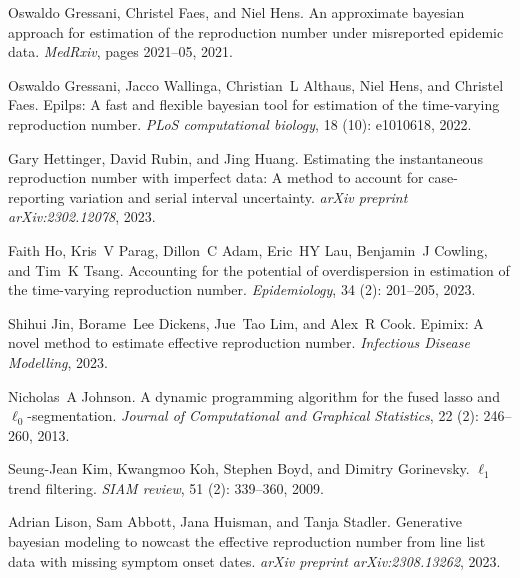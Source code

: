 \documentclass[10pt,letterpaper]{article}
\begin{document}
\begin{thebibliography}{23}
  Oswaldo Gressani, Christel Faes, and Niel Hens.
  \newblock An approximate bayesian approach for estimation of the reproduction
    number under misreported epidemic data.
  \newblock \emph{MedRxiv}, pages 2021--05, 2021.
  
  Oswaldo Gressani, Jacco Wallinga, Christian~L Althaus, Niel Hens, and Christel
    Faes.
  \newblock Epilps: A fast and flexible bayesian tool for estimation of the
    time-varying reproduction number.
  \newblock \emph{PLoS computational biology}, 18 (10):
    e1010618, 2022.
  
  Gary Hettinger, David Rubin, and Jing Huang.
  \newblock Estimating the instantaneous reproduction number with imperfect data:
    A method to account for case-reporting variation and serial interval
    uncertainty.
  \newblock \emph{arXiv preprint arXiv:2302.12078}, 2023.
  
  Faith Ho, Kris~V Parag, Dillon~C Adam, Eric~HY Lau, Benjamin~J Cowling, and
    Tim~K Tsang.
  \newblock Accounting for the potential of overdispersion in estimation of the
    time-varying reproduction number.
  \newblock \emph{Epidemiology}, 34 (2): 201--205, 2023.
  
  Shihui Jin, Borame~Lee Dickens, Jue~Tao Lim, and Alex~R Cook.
  \newblock Epimix: A novel method to estimate effective reproduction number.
  \newblock \emph{Infectious Disease Modelling}, 2023.
  
  Nicholas~A Johnson.
  \newblock A dynamic programming algorithm for the fused lasso and
    $\ell_0$-segmentation.
  \newblock \emph{Journal of Computational and Graphical Statistics}, 22
    (2): 246--260, 2013.
  
  Seung-Jean Kim, Kwangmoo Koh, Stephen Boyd, and Dimitry Gorinevsky.
  \newblock $\ell_1$ trend filtering.
  \newblock \emph{SIAM review}, 51 (2): 339--360, 2009.
  
  Adrian Lison, Sam Abbott, Jana Huisman, and Tanja Stadler.
  \newblock Generative bayesian modeling to nowcast the effective reproduction
    number from line list data with missing symptom onset dates.
  \newblock \emph{arXiv preprint arXiv:2308.13262}, 2023.
  

\end{thebibliography}
\end{document}
